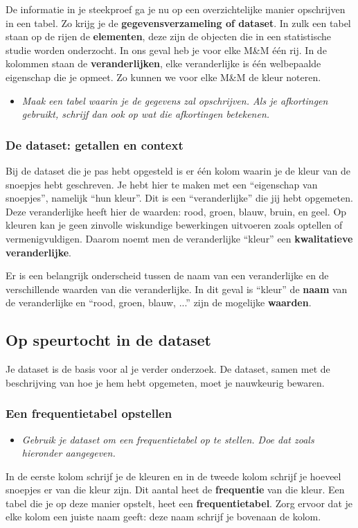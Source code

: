 \documentclass[11pt]{article}
\newcommand{\vraag}[2]{\begin{itemize}\item {\it #1} \vspace*{#2}\end{itemize}}
\begin{document}
De informatie in je steekproef ga je nu op een overzichtelijke manier opschrijven in een tabel. Zo krijg je de
{\bf gegevensverzameling of dataset}. In zulk een tabel staan op de rijen de {\bf elementen}, deze zijn de objecten die in een statistische studie worden onderzocht. In ons geval heb je voor elke M\&M één rij. In de kolommen staan de {\bf veranderlijken}, elke veranderlijke is één welbepaalde eigenschap die je opmeet. Zo kunnen we voor elke M\&M de kleur noteren.

\vraag{Maak een tabel waarin je de gegevens zal opschrijven. Als je afkortingen gebruikt, schrijf dan ook op wat die afkortingen betekenen.}{10cm}

\subsubsection{De dataset: getallen en context}
Bij de dataset die je pas hebt opgesteld is er één kolom waarin je de kleur van de snoepjes hebt
geschreven. Je hebt hier te maken met een “eigenschap van snoepjes”, namelijk “hun kleur”. Dit is
een “veranderlijke” die jij hebt opgemeten. Deze veranderlijke heeft hier de waarden: rood, groen,
blauw, bruin, en geel.
Op kleuren kan je geen zinvolle wiskundige bewerkingen uitvoeren zoals optellen of
vermenigvuldigen. Daarom noemt men de veranderlijke “kleur” een {\bf kwalitatieve veranderlijke}.

Er is een belangrijk onderscheid tussen de naam van een veranderlijke en de
verschillende waarden van die veranderlijke.
In dit geval is “kleur” de {\bf naam} van de veranderlijke en “rood, groen, blauw,
...” zijn de mogelijke {\bf waarden}.

\subsection{Op speurtocht in de dataset}

Je dataset is de basis voor al je verder onderzoek. De dataset, samen met de beschrijving van hoe je
hem hebt opgemeten, moet je nauwkeurig bewaren.

\subsubsection{Een frequentietabel opstellen}

\vraag{Gebruik je dataset om een frequentietabel op te stellen. Doe dat zoals hieronder aangegeven.}{0cm}

In de eerste kolom schrijf je de kleuren en in de tweede kolom schrijf je hoeveel snoepjes er van die
kleur zijn. Dit aantal heet de {\bf frequentie} van die kleur. Een tabel die je op deze manier opstelt, heet
een {\bf frequentietabel}. Zorg ervoor dat je elke kolom een juiste naam geeft: deze naam schrijf je
bovenaan de kolom.
\end{document}
